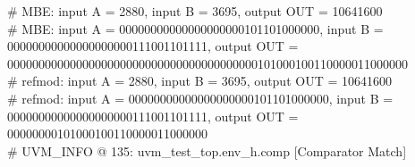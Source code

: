 \# MBE: input A =       2880, input B =       3695, output OUT =             10641600\\
\# MBE: input A = 00000000000000000000101101000000, input B = 00000000000000000000111001101111, output OUT = 0000000000000000000000000000000000000000101000100110000011000000\\
\# refmod: input A =        2880, input B =        3695, output OUT =    10641600\\
\# refmod: input A = 00000000000000000000101101000000, input B = 00000000000000000000111001101111, output OUT = 00000000101000100110000011000000\\
\# UVM\_INFO @ 135: uvm\_test\_top.env\_h.comp [Comparator Match] \\